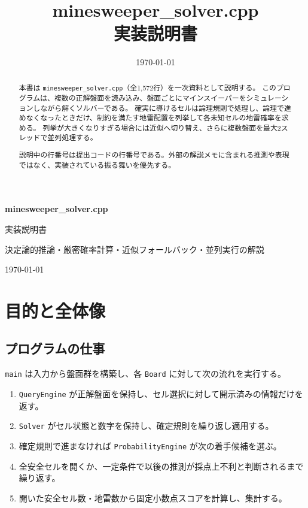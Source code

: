 \documentclass[uplatex,dvipdfmx,11pt]{jsarticle}
\title{minesweeper\_solver.cpp\\実装説明書}
\date{\today}
\newcommand{\code}[1]{\texttt{#1}}
\begin{document}
\begin{titlepage}
  \centering
  \vspace*{\fill}
  {\Huge\bfseries minesweeper\_solver.cpp\par}
  \vspace{6mm}
  {\LARGE 実装説明書\par}
  \vspace{24mm}
  {\large
    決定論的推論・厳密確率計算・近似フォールバック・並列実行の解説\par}
  \vspace{8mm}
  {\large \today\par}
  \vspace*{\fill}
\end{titlepage}
\clearpage
{}

\begin{abstract}
本書は \code{minesweeper\_solver.cpp}（全1,572行）を一次資料として説明する。
このプログラムは、複数の正解盤面を読み込み、盤面ごとにマインスイーパーをシミュレーションしながら解くソルバーである。
確実に導けるセルは論理規則で処理し、論理で進めなくなったときだけ、制約を満たす地雷配置を列挙して各未知セルの地雷確率を求める。
列挙が大きくなりすぎる場合には近似へ切り替え、さらに複数盤面を最大2スレッドで並列処理する。

説明中の行番号は提出コードの行番号である。外部の解説メモに含まれる推測や表現ではなく、実装されている振る舞いを優先する。
\end{abstract}

\tableofcontents
\newpage

\section{目的と全体像}

\subsection{プログラムの仕事}
\code{main} は入力から盤面群を構築し、各 \code{Board} に対して次の流れを実行する。

\begin{enumerate}[label=\arabic*.]
  \item \code{QueryEngine} が正解盤面を保持し、セル選択に対して開示済みの情報だけを返す。
  \item \code{Solver} がセル状態と数字を保持し、確定規則を繰り返し適用する。
  \item 確定規則で進まなければ \code{ProbabilityEngine} が次の着手候補を選ぶ。
  \item 全安全セルを開くか、一定条件で以後の推測が採点上不利と判断されるまで繰り返す。
  \item 開いた安全セル数・地雷数から固定小数点スコアを計算し、集計する。
\end{enumerate}
\end{document}
